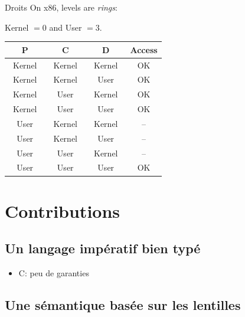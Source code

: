 \documentclass{beamer}
\begin{document}
\begin{frame}{Droits}
On x86, levels are \emph{rings}:

Kernel $= 0$ and User $= 3$.

\begin{center}
\def\modeK{~Kernel~}
\def\modeU{~User~}
\def\accOK{OK}
\def\accNO{--}
\begin{tabular}{cccc}
\toprule
  P
& C
& D
& Access \\
\midrule
  \modeK{} & \modeK{} & \modeK{} & \accOK \\
  \modeK{} & \modeK{} & \modeU{} & \accOK \\
  \modeK{} & \modeU{} & \modeK{} & \accOK \\
  \modeK{} & \modeU{} & \modeU{} & \accOK \\
  \modeU{} & \modeK{} & \modeK{} & \accNO \\
  \modeU{} & \modeK{} & \modeU{} & \accNO \\
  \modeU{} & \modeU{} & \modeK{} & \accNO \\
  \modeU{} & \modeU{} & \modeU{} & \accOK \\
\bottomrule
\end{tabular}
\end{center}

\end{frame}

\section{Contributions}

\subsection{Un langage impératif bien typé}

\begin{frame}
    \begin{itemize}
        \item C: peu de garanties
    \end{itemize}
\end{frame}

\subsection{Une sémantique basée sur les lentilles}
\end{document}
